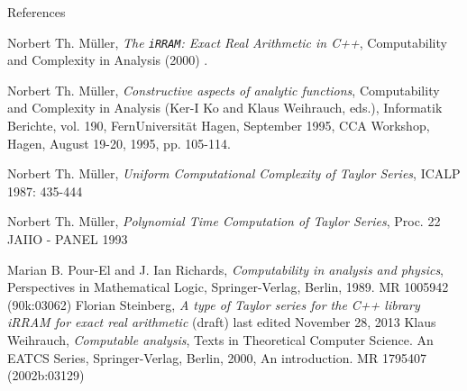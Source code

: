 \documentclass[xcolor=pdftex,dvipsnames,table]{beamer}
\newcommand{\irram}{\texttt{iRRAM}\xspace}
\begin{document}
{\begin{frame}{References}
\begin{thebibliography}{10}
  \beamertemplatearticlebibitems
	Norbert Th. M\"{u}ller,
    \newblock \emph{ The \irram: Exact Real Arithmetic in C++}, Computability and Complexity in Analysis (2000) .

  \beamertemplatearticlebibitems
	Norbert Th. M\"{u}ller,
    \newblock \emph{ Constructive aspects of analytic functions}, Computability
and Complexity in Analysis (Ker-I Ko and Klaus Weihrauch, eds.),
Informatik Berichte, vol. 190, FernUniversit\"{a}t Hagen, September
1995, CCA Workshop, Hagen, August 19-20, 1995, pp. 105-114.

  \beamertemplatearticlebibitems
	Norbert Th. M\"{u}ller,
    \newblock \emph{ Uniform Computational Complexity of Taylor Series}, ICALP 1987: 435-444

  \beamertemplatearticlebibitems
	Norbert Th. M\"{u}ller,
    \newblock \emph{ Polynomial Time Computation of Taylor Series}, Proc. 22 JAIIO - PANEL 1993

  \beamertemplatearticlebibitems
	Marian B. Pour-El and J. Ian Richards,
    \newblock \emph{ Computability in analysis
and physics}, Perspectives in Mathematical Logic, Springer-Verlag,
Berlin, 1989. MR 1005942 (90k:03062)
  \beamertemplatearticlebibitems
	Florian Steinberg,
    \newblock \emph{A type of Taylor series for the C++ library iRRAM for exact real arithmetic} (draft) last edited November 28, 2013
  \beamertemplatearticlebibitems
	Klaus Weihrauch,
    \newblock \emph{Computable analysis}, Texts in Theoretical Computer
Science. An EATCS Series, Springer-Verlag, Berlin, 2000, An
introduction. MR 1795407 (2002b:03129)

  \end{thebibliography}

\end{frame}
}
\end{document}
